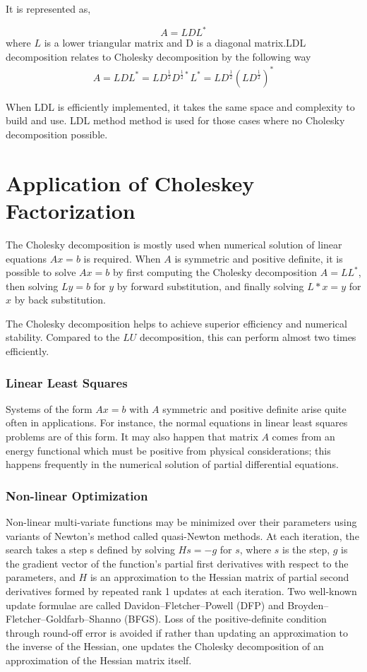It is represented as,

\begin{equation*}
	A = LDL^*
\end{equation*}
where $L$ is a lower triangular matrix and D is a diagonal matrix.LDL decomposition relates to Cholesky decomposition by the following way
\begin{equation*}
	\begin{aligned}
		A=LDL^*=LD^{\frac{1}{2}}D^{\frac{1}{2}*}L^*=LD^{\frac{1}{2}}(LD^{\frac{1}{2}})^*
	\end{aligned}
\end{equation*}

When LDL is efficiently implemented, it takes the same space and complexity to build and use. LDL method method is used for those cases where no Cholesky decomposition possible.

\section{Application of Choleskey Factorization}
The Cholesky decomposition is mostly used when numerical solution of linear equations $Ax = b$ is required. When $A$ is symmetric and positive definite, it is possible to solve $Ax = b$ by first computing the Cholesky decomposition $A = LL^*$, then solving $Ly = b$ for $y$ by forward substitution, and finally solving $L*x = y$ for $x$ by back substitution.

The Cholesky decomposition helps to achieve superior efficiency and numerical stability. Compared to the $LU$ decomposition, this can perform almost two times efficiently.
\subsubsection*{Linear Least Squares}
Systems of the form $Ax = b$ with $A$ symmetric and positive definite arise quite often in applications. For instance, the normal equations in linear least squares problems are of this form. It may also happen that matrix $A$ comes from an energy functional which must be positive from physical considerations; this happens frequently in the numerical solution of partial differential equations.
\subsubsection*{Non-linear Optimization}
Non-linear multi-variate functions may be minimized over their parameters using variants of Newton's method called quasi-Newton methods. At each iteration, the search takes a step s defined by solving $Hs = -g$ for $s$, where $s$ is the step, $g$ is the gradient vector of the function's partial first derivatives with respect to the parameters, and $H$ is an approximation to the Hessian matrix of partial second derivatives formed by repeated rank 1 updates at each iteration. Two well-known update formulae are called Davidon–Fletcher–Powell (DFP) and Broyden–Fletcher–Goldfarb–Shanno (BFGS). Loss of the positive-definite condition through round-off error is avoided if rather than updating an approximation to the inverse of the Hessian, one updates the Cholesky decomposition of an approximation of the Hessian matrix itself.

